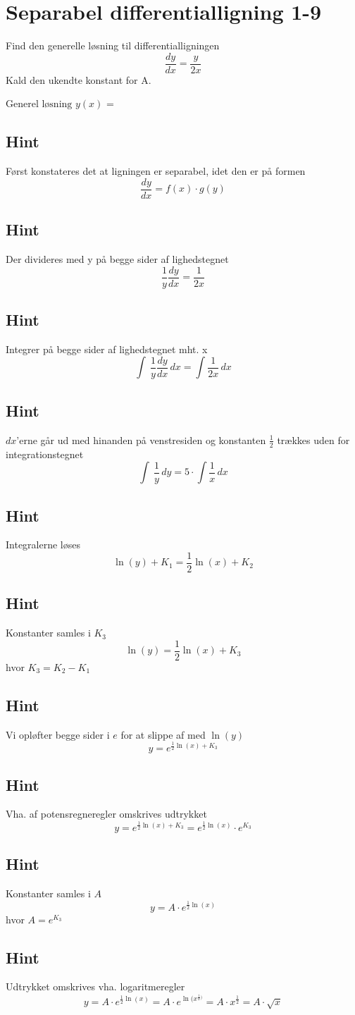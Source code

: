 \documentclass{article}
\newenvironment{exercise}[1]{\newpage\section{#1}}{}
\newcommand{\answerbox}[1]{\fbox{$#1$}}
\newcommand{\hint}{\subsection*{Hint}}
\begin{document}
\newpage

\begin{exercise}{Separabel differentialligning 1-9}
	
	
	Find den generelle løsning til differentialligningen 
	\[
	\frac{dy}{dx} = \frac{y}{2x}
	\]
	Kald den ukendte konstant for A.
	
	$\textrm{Generel løsning } y(x)$ = \answerbox{A \cdot \sqrt{x}}
	
	\hint
	
	Først konstateres det at ligningen er separabel, idet den er på formen
	\[
	\frac{dy}{dx} = f(x) \cdot g(y)
	\]
	
	\hint 
	Der divideres med y på begge sider af lighedstegnet
	\[
	\frac{1}{y} \frac{dy}{dx} = \frac{1}{2x}
	\]
	
	\hint
	
	Integrer på begge sider af lighedstegnet mht. x
	\[
	\int\ \frac{1}{y} \frac{dy}{dx} \, dx= \int \frac{1}{2x} \,dx
	\]
	
	\hint
	
	$dx$'erne går ud med hinanden på venstresiden og konstanten $\frac{1}{2}$ trækkes uden for integrationstegnet
	\[
	\int\ \frac{1}{y}\, dy= 5 \cdot \int \frac{1}{x}\,dx
	\]
	
	\hint
	
	Integralerne løses
	\[
	\ln(y) + K_1 =\frac{1}{2} \ln(x) + K_2
	\]
	
	
	\hint
	
	Konstanter samles i $K_3$
	\[
	\ln(y) =\frac{1}{2} \ln(x) + K_3
	\]
	hvor $K_3=K_2-K_1$
	
	\hint 
	
	Vi opløfter begge sider i $e$ for at slippe af med $\ln(y)$
	\[
	y = e^{\frac{1}{2} \ln(x) + K_3}
	\]
	
	\hint
	
	Vha.  af potensregneregler omskrives udtrykket
	\[
	y = e^{\frac{1}{2} \ln(x) + K_3} = e^{\frac{1}{2} \ln(x)}  \cdot e^{K_3}
	\]
	
	\hint
	
	Konstanter samles i $A$
	\[
	y = A \cdot e^{\frac{1}{2} \ln(x)}
	\]
	hvor $ A= e^{K_3}$
	
	\hint 
	
	Udtrykket omskrives vha. logaritmeregler
	\[
	y = A \cdot e^{\frac{1}{2} \ln(x)} = A \cdot e^{\ln(x^{\frac{1}{2})}} = A \cdot x^{\frac{1}{2}} = A \cdot \sqrt{x}
	\]
	
\end{exercise}

\newpage
\end{document}
